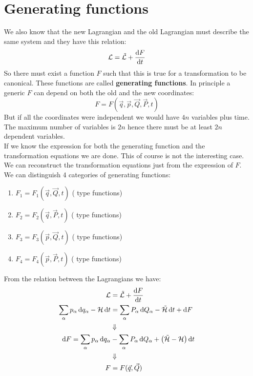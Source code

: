 \section{Generating functions}
We also know that the new Lagrangian and the old Lagrangian must describe the same system and they have this relation:
\begin{equation}
    \lagr = \tilde{\lagr}+\dv{F}{t}
\end{equation}
So there must exist a function $F$ such that this is true for a transformation to be canonical. These functions are called \textbf{generating functions}.
In principle a generic $F$ can depend on both the old and the new coordinates:
\begin{equation}
    F = F(\vec{q},\vec{p},\vec{Q},\vec{P},t)
\end{equation}
But if all the coordinates were independent we would have $4n$ variables plus time. The maximum number of variables is $2n$ hence there must be at least $2n$ dependent variables.\\
If we know the expression for both the generating function and the transformation equations we are done. This of course is not the interesting case. We can reconstruct the transformation equations just from the expression of $F$. We can distinguish 4 categories of generating functions:
\begin{enumerate}
    \item $F_1 = F_1(\vec{q},\vec{Q},t)$ ( type functions)
    \item $F_2 = F_2(\vec{q},\vec{P},t)$ (  type functions)
    \item $F_3 = F_3(\vec{p},\vec{Q},t)$ (  type functions)
    \item $F_4 = F_4(\vec{p},\vec{P},t)$ (  type functions)
\end{enumerate}
From the relation between the Lagrangians we have:
\begin{equation}
    \begin{split}
        \lagr &= \tilde{\lagr}+\dv{F}{t}\\
        \bigsum_{\alpha}p_{\alpha}\dd{q_{\alpha}} - \hamfun\dd{t} &= \bigsum_{\alpha}P_{\alpha}\dd{Q_{\alpha}} - \tilde{\hamfun}\dd{t} + \dd{F}\\
        &\Downarrow \\
        \dd{F} = \bigsum_{\alpha}p_{\alpha}\dd{q_{\alpha}} &- \bigsum_{\alpha}P_{\alpha}\dd{Q_{\alpha}} + \brackets{\tilde{\hamfun}- \hamfun}\dd{t}\\
        &\Downarrow \\
        F &= F(\vec{q},\vec{Q})
    \end{split}
\end{equation}
